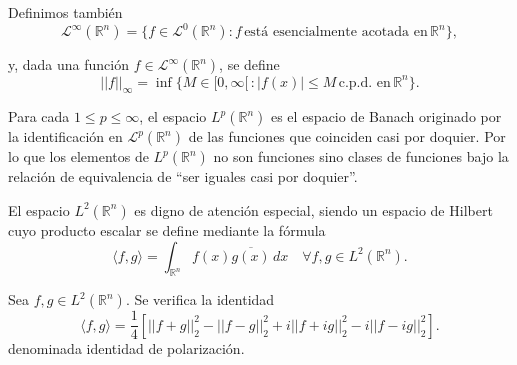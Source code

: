 \noindent Definimos también 
\begin{equation}
    \mathscr{L}^{\infty}(\mathbb{R}^n) = \{f \in \mathscr{L}^{0}(\mathbb{R}^n): f \, \text{está esencialmente acotada en}\, \mathbb{R}^n\},
\end{equation}

\noindent y, dada una función $f \in \mathscr{L}^\infty(\mathbb{R}^n)$, se define
\begin{equation}
    ||f||_\infty = \inf\{M \in [0, \infty[\,: |f(x)|\leq M \, \text{c.p.d. en}\, \mathbb{R}^n\}.
\end{equation}

\noindent Para cada $1 \leq p \leq \infty$, el espacio $L^p(\mathbb{R}^n)$ es el espacio de Banach originado por la identificación en $\mathscr{L}^p(\mathbb{R}^n)$ de las funciones que coinciden casi por doquier.
Por lo que los elementos de $L^p(\mathbb{R}^n)$ no son funciones sino clases de funciones bajo la relación
de equivalencia de “ser iguales casi por doquier”. 

\noindent El espacio \( L^2(\mathbb{R}^n) \) es digno de atención especial, siendo un espacio de Hilbert cuyo producto escalar se define mediante la fórmula
\begin{equation}
    \langle f,g \rangle = \int_{\mathbb{R}^n}f(x)\overline{g(x)}\, dx \quad \forall f,g \in  L^2(\mathbb{R}^n).
\end{equation}

\begin{proposicion}
    Sea \(f,g \in L^2(\mathbb{R}^n)\). Se verifica la  identidad
    \begin{equation}
         \langle f,g \rangle = \frac{1}{4} \left[ ||f+g||_2^2 - ||f-g||_2^2 + i||f+ig||_2^2 - i||f-ig||_2^2 \right].
    \end{equation}
denominada identidad de polarización.
\end{proposicion}


